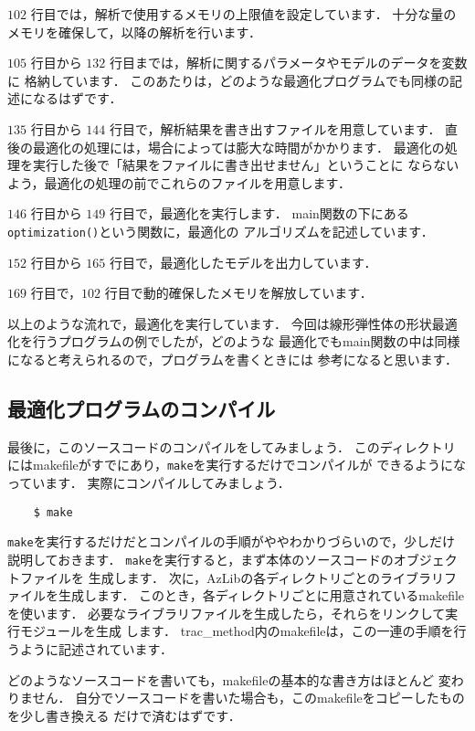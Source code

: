 $102$ 行目では，解析で使用するメモリの上限値を設定しています．
十分な量のメモリを確保して，以降の解析を行います．

$105$ 行目から $132$ 行目までは，解析に関するパラメータやモデルのデータを変数に
格納しています．
このあたりは，どのような最適化プログラムでも同様の記述になるはずです．

$135$ 行目から $144$ 行目で，解析結果を書き出すファイルを用意しています．
直後の最適化の処理には，場合によっては膨大な時間がかかります．
最適化の処理を実行した後で「結果をファイルに書き出せません」ということに
ならないよう，最適化の処理の前でこれらのファイルを用意します．

$146$ 行目から $149$ 行目で，最適化を実行します．
main関数の下にある\texttt{optimization()}という関数に，最適化の
アルゴリズムを記述しています．

$152$ 行目から $165$ 行目で，最適化したモデルを出力しています．

$169$ 行目で，$102$ 行目で動的確保したメモリを解放しています．

以上のような流れで，最適化を実行しています．
今回は線形弾性体の形状最適化を行うプログラムの例でしたが，どのような
最適化でもmain関数の中は同様になると考えられるので，プログラムを書くときには
参考になると思います．

\subsection{最適化プログラムのコンパイル}
最後に，このソースコードのコンパイルをしてみましょう．
このディレクトリにはmakefileがすでにあり，\verb|make|を実行するだけでコンパイルが
できるようになっています．
実際にコンパイルしてみましょう．
\begin{verbatim}
    $ make
\end{verbatim}

\verb|make|を実行するだけだとコンパイルの手順がややわかりづらいので，少しだけ
説明しておきます．
\verb|make|を実行すると，まず本体のソースコードのオブジェクトファイルを
生成します．
次に，AzLibの各ディレクトリごとのライブラリファイルを生成します．
このとき，各ディレクトリごとに用意されているmakefileを使います．
必要なライブラリファイルを生成したら，それらをリンクして実行モジュールを生成
します．
trac\_method内のmakefileは，この一連の手順を行うように記述されています．

どのようなソースコードを書いても，makefileの基本的な書き方はほとんど
変わりません．
自分でソースコードを書いた場合も，このmakefileをコピーしたものを少し書き換える
だけで済むはずです．

